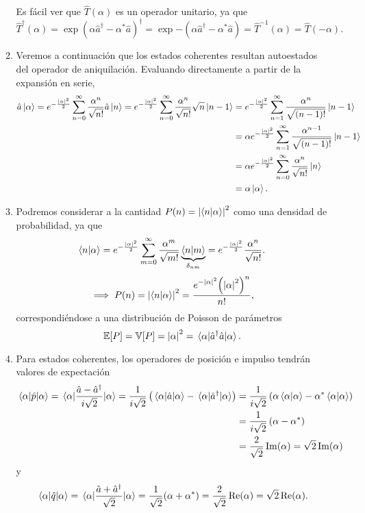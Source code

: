 \documentclass{scrartcl}
\newcommand{\inv}[1]{\frac{1}{#1}}
\renewcommand{\a}{\hat{a}}
\DeclareRobustCommand{\[}{\begin{equation}}
\DeclareRobustCommand{\]}{\end{equation}}
\begin{document}
\begin{enumerate}
\begin{enumerate}
        Es fácil ver que $\hat T(\alpha)$ es un operador unitario, ya que
        \[ \hat{T}^\dagger(\alpha) = \exp{(\alpha \a^\dagger - \alpha^* \a)^\dagger} = \exp{-(\alpha \a^\dagger - \alpha^* \a)} = \hat T^{-1}(\alpha) = \hat T(-\alpha). \]
        
        
        \item Veremos a continuación que los estados coherentes resultan autoestados del operador de aniquilación. Evaluando directamente a partir de la expansión en serie,
        \begin{align}
            \a \ket{\alpha} = e^{-\frac{\abs{\alpha}^2}{2}} \sum_{n = 0}^\infty \frac{\alpha^n}{\sqrt{n!}} \a \ket{n} = e^{-\frac{\abs{\alpha}^2}{2}} \sum_{n = 0}^\infty \frac{\alpha^n}{\sqrt{n!}} \sqrt{n} \ket{n - 1} &= e^{-\frac{\abs{\alpha}^2}{2}} \sum_{n = 1}^\infty \frac{\alpha^n}{\sqrt{(n - 1)!}} \ket{n - 1} \\
                &= \alpha e^{-\frac{\abs{\alpha}^2}{2}} \sum_{n = 1}^\infty \frac{\alpha^{n - 1}}{\sqrt{(n - 1)!}} \ket{n - 1} \\
                &= \alpha e^{-\frac{\abs{\alpha}^2}{2}} \sum_{n = 0}^\infty \frac{\alpha^n}{\sqrt{n!}} \ket{n} \\
                &= \alpha \ket{\alpha}.
        \end{align}
        
        
        \item Podremos considerar a la cantidad $P(n) = \abs{\ip{n}{\alpha}}^2$ como una densidad de probabilidad, ya que
        \[ \ip{n}{\alpha} = e^{-\frac{\abs{\alpha}^2}{2}} \sum_{m = 0}^\infty \frac{\alpha^m}{\sqrt{m!}} \underbrace{\ip{n}{m}}_{\delta_{nm}} = e^{-\frac{\abs{\alpha}^2}{2}} \frac{\alpha^n}{\sqrt{n!}}. \]
        \[ \implies P(n) = \abs{\ip{n}{\alpha}}^2 = \frac{\displaystyle e^{-\abs{\alpha}^2} \qty(\abs{\alpha}^2)^n}{n!}, \]
        correspondiéndose a una distribución de Poisson de parámetros 
        \[ \mathbb{E}[P] = \mathbb{V}[P] = \abs{\alpha}^2 = \mel{\alpha}{\a^\dagger \a}{\alpha}. \]
        
        
        \item Para estados coherentes, los operadores de posición e impulso tendrán valores de expectación
        \begin{align}
            \mel{\alpha}{\hat p}{\alpha} = \mel{\alpha}{\frac{\a - \a^\dagger}{i \sqrt{2}}}{\alpha} = \inv{i \sqrt{2}} \left( \mel{\alpha}{\a}{\alpha} - \mel{\alpha}{\a^\dagger}{\alpha} \right) &= \inv{i \sqrt{2}} \left( \alpha \ip{\alpha}{\alpha} - \alpha^* \ip{\alpha}{\alpha} \right) \\
                &= \inv{i \sqrt{2}} \left( \alpha - \alpha^* \right) \\
                &= \frac{2}{\sqrt{2}} \Im(\alpha) = \sqrt{2} \Im(\alpha)
        \end{align}
        y
        \[ \mel{\alpha}{\hat q}{\alpha} = \mel{\alpha}{\frac{\a + \a^\dagger}{\sqrt{2}}}{\alpha} = \inv{\sqrt{2}} (\alpha + \alpha^*) = \frac{2}{\sqrt{2}} \Re(\alpha) = \sqrt{2} \Re(\alpha). \]
        

\end{enumerate}
\end{enumerate}
\end{document}
